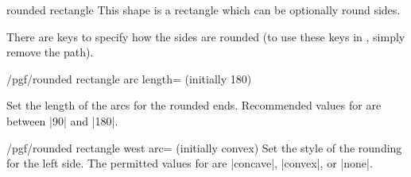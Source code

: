 \begin{shape}{rounded rectangle}
	This shape is a rectangle which can be optionally round sides.

\begin{codeexample}[]
\end{codeexample}

	There are keys to specify how the sides are rounded (to use
	these keys in \tikzname, simply remove the  path).


\begin{key}{/pgf/rounded rectangle arc length= (initially 180)}

	Set the length of the arcs for the rounded ends. Recommended values 
	for	 are between |90| and |180|. 
	
\begin{codeexample}[]
\end{codeexample}

\end{key}

\begin{key}{/pgf/rounded rectangle west arc= (initially convex)}
	Set the style of the rounding for the left side. The permitted values
	for  are |concave|, |convex|, or |none|.

\begin{codeexample}[]
\end{codeexample}
\end{key}


\end{shape}
